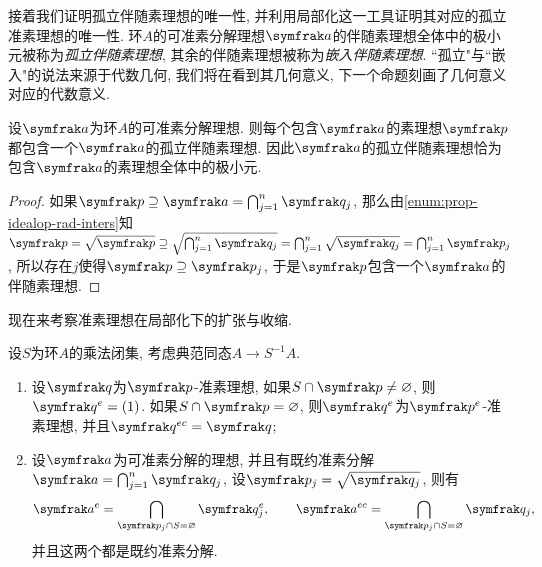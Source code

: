 接着我们证明孤立伴随素理想的唯一性, 并利用局部化这一工具证明其对应的孤立准素理想的唯一性. 环$A$的可准素分解理想$\ideal{a}$的伴随素理想全体中的极小元被称为\emph{孤立伴随素理想}, 其余的伴随素理想被称为\emph{嵌入伴随素理想}. ``孤立"与``嵌入"的说法来源于代数几何, 我们将在看到其几何意义, 下一个命题刻画了几何意义对应的代数意义.

\begin{proposition}\label{prop:isolatedprime}
  设$\ideal{a}$为环$A$的可准素分解理想. 则每个包含$\ideal{a}$的素理想$\ideal{p}$都包含一个$\ideal{a}$的孤立伴随素理想. 因此$\ideal{a}$的孤立伴随素理想恰为包含$\ideal{a}$的素理想全体中的极小元.
\end{proposition}

\begin{proof}
  如果$\ideal{p}\supseteq\ideal{a}=\bigcap_{j=1}^n\ideal{q}_j$, 那么由\ref{enum:prop-idealop-rad-inters}知$\ideal{p}=\sqrt{\ideal{p}}\supseteq\sqrt{\bigcap_{j=1}^n\ideal{q}_j}=\bigcap_{j=1}^n\sqrt{\ideal{q}_j}=\bigcap_{j=1}^n\ideal{p}_j$, 所以存在$j$使得$\ideal{p}\supseteq\ideal{p}_j$, 于是$\ideal{p}$包含一个$\ideal{a}$的伴随素理想.
\end{proof}

现在来考察准素理想在局部化下的扩张与收缩.

\begin{proposition}\label{prop:primlocal}设$S$为环$A$的乘法闭集, 考虑典范同态$A\to S^{-1}A$.
  \begin{enumerate}
    \item\label{enum:prop-primlocal-exten} 设$\ideal{q}$为$\ideal{p}$-准素理想, 如果$S\cap\ideal{p}\neq\varnothing$, 则$\ideal{q}^e=(1)$. 如果$S\cap\ideal{p}=\varnothing$, 则$\ideal{q}^e$为$\ideal{p}^e$-准素理想, 并且$\ideal{q}^{ec}=\ideal{q}$;
    \item\label{enum:prop-primlocal-decom} 设$\ideal{a}$为可准素分解的理想, 并且有既约准素分解$\ideal{a}=\bigcap_{j=1}^n\ideal{q}_j$, 设$\ideal{p}_j=\sqrt{\ideal{q}_j}$, 则有
    \begin{equation*}
      \ideal{a}^{e}=\bigcap_{\ideal{p}_j\cap S=\varnothing}\ideal{q}_j^e,
      \qquad \ideal{a}^{ec}=\bigcap_{\ideal{p}_j\cap S=\varnothing}\ideal{q}_j,
    \end{equation*}
    并且这两个都是既约准素分解.
  \end{enumerate}
\end{proposition}

